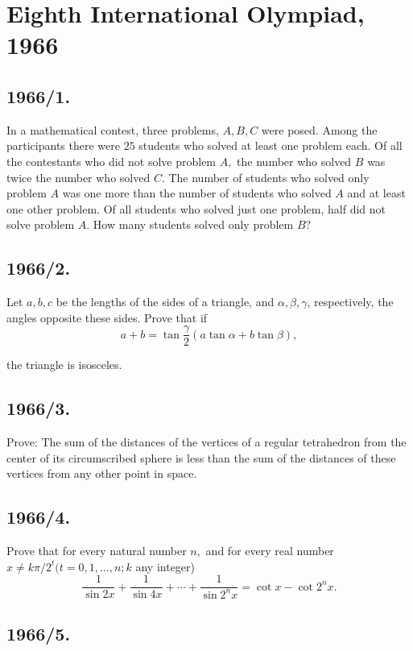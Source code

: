 \documentclass[12pt,thmsa]{article}
\begin{document}
\section{Eighth International Olympiad, 1966}

\subsection{1966/1.}

In a mathematical contest, three problems, $A,B,C$ were posed. Among the
participants there were $25$ students who solved at least one problem each.
Of all the contestants who did not solve problem $A,$ the number who solved $%
B$ was twice the number who solved $C.$ The number of students who solved
only problem $A$ was one more than the number of students who solved $A$ and
at least one other problem. Of all students who solved just one problem,
half did not solve problem $A.$ How many students solved only problem $B$?

\subsection{1966/2.}

Let $a,b,c$ be the lengths of the sides of a triangle, and $\alpha ,\beta
,\gamma $, respectively, the angles opposite these sides. Prove that if
\[
a+b=\tan \frac{\gamma }{2}(a\tan \alpha +b\tan \beta ),
\]

the triangle is isosceles.

\subsection{1966/3.}

Prove: The sum of the distances of the vertices of a regular tetrahedron
from the center of its circumscribed sphere is less than the sum of the
distances of these vertices from any other point in space.

\subsection{1966/4.}

Prove that for every natural number $n,$ and for every real number $x\neq
k\pi /2^{t}(t=0,1,...,n;k$ any integer)
\[
\frac{1}{\sin 2x}+\frac{1}{\sin 4x}+\cdots +\frac{1}{\sin 2^{n}x}=\cot
x-\cot 2^{n}x.
\]

\subsection{1966/5.}
\end{document}
